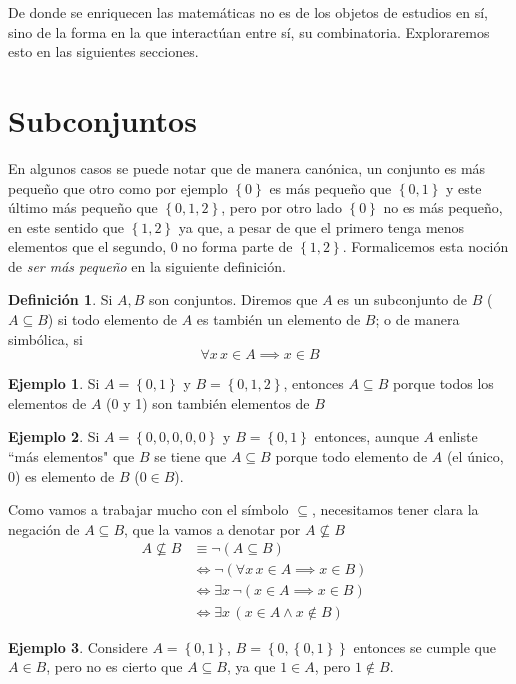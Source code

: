 \documentclass{book}
\newcommand{\set}[1]{\left\lbrace #1 \right\rbrace }
\theoremstyle{definition}
\newtheorem{df}{Definición}[chapter]
\newtheorem{ejm}{Ejemplo}[chapter]
\begin{document}
De donde se enriquecen las matemáticas no es de los objetos de estudios en sí, sino de la forma en la que interactúan entre sí, su combinatoria.
Exploraremos esto en las siguientes secciones.
\section{Subconjuntos}
En algunos casos se puede notar que de manera canónica, un conjunto es más pequeño que otro como por ejemplo $\set{0}$ es más pequeño que $\set{0,1}$ y este último más pequeño que $\set{0,1,2}$, pero por otro lado $\set{0}$ no es más pequeño, en este sentido que $\set{1,2}$ ya que, a pesar de que el primero tenga menos elementos que el segundo, $0$ no forma parte de $\set{1,2}$.
Formalicemos esta noción de \emph{ser más pequeño} en la siguiente definición.
\begin{df}
	Si $A,B$ son conjuntos. Diremos que $A$ es un subconjunto de $B$ ($A\subseteq B$) si todo elemento de $A$ es también un elemento de $B$; o de manera simbólica, si
	\[\forall x\, x\in A \implies x \in B \]
\end{df}

\begin{ejm}
	Si $A=\set{0,1}$ y $B=\set{0,1,2}$, entonces $A\subseteq B$ porque todos los elementos de $A$ (0 y 1) son también elementos de $B$
\end{ejm}

\begin{ejm}
	Si $A=\set{0,0,0,0,0}$ y $B=\set{0,1}$ entonces, aunque $A$ enliste ``más elementos" que $B$ se tiene que $A\subseteq B$ porque todo elemento de $A$ (el único, $0$) es elemento de $B$ ($0 \in B$). 
\end{ejm}

Como vamos a trabajar mucho con el símbolo $\subseteq$, necesitamos tener clara la negación de $A\subseteq B$, que la vamos a denotar por $A \not \subseteq B$
\begin{align*}
	A \not \subseteq B &\equiv \neg (A \subseteq B) & \\
	&\iff \neg (\forall x\, x \in A \implies x \in B)\\
	&\iff \exists x\, \neg (x \in A \implies x \in B)\\
	&\iff \exists x\, \left( x\in A \wedge x \notin B \right)
\end{align*}

\begin{ejm}
	Considere $A = \set{0,1}$, $B=\set{0,\set{0,1}}$ entonces se cumple que $A\in B$, pero no es cierto que $A\subseteq B$, ya que $1\in A$, pero $1 \notin B$.
\end{ejm}
\end{document}

